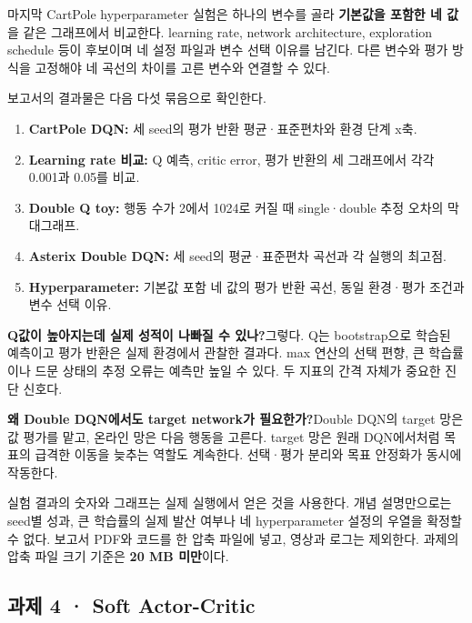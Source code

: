 \documentclass[11pt,a4paper]{article}
\begin{document}
마지막 CartPole hyperparameter 실험은 하나의 변수를 골라 \textbf{기본값을 포함한 네 값}을 같은 그래프에서 비교한다. learning rate, network architecture, exploration schedule 등이 후보이며 네 설정 파일과 변수 선택 이유를 남긴다. 다른 변수와 평가 방식을 고정해야 네 곡선의 차이를 고른 변수와 연결할 수 있다.\par

보고서의 결과물은 다음 다섯 묶음으로 확인한다.\par

\begin{enumerate}
\item \textbf{CartPole DQN:} 세 seed의 평가 반환 평균·표준편차와 환경 단계 x축.
\item \textbf{Learning rate 비교:} Q 예측, critic error, 평가 반환의 세 그래프에서 각각 0.001과 0.05를 비교.
\item \textbf{Double Q toy:} 행동 수가 2에서 1024로 커질 때 single·double 추정 오차의 막대그래프.
\item \textbf{Asterix Double DQN:} 세 seed의 평균·표준편차 곡선과 각 실행의 최고점.
\item \textbf{Hyperparameter:} 기본값 포함 네 값의 평가 반환 곡선, 동일 환경·평가 조건과 변수 선택 이유.
\end{enumerate}

\par\medskip\noindent\textbf{Q값이 높아지는데 실제 성적이 나빠질 수 있나?}\quad 그렇다. Q는 bootstrap으로 학습된 예측이고 평가 반환은 실제 환경에서 관찰한 결과다. max 연산의 선택 편향, 큰 학습률이나 드문 상태의 추정 오류는 예측만 높일 수 있다. 두 지표의 간격 자체가 중요한 진단 신호다.\par

\par\medskip\noindent\textbf{왜 Double DQN에서도 target network가 필요한가?}\quad Double DQN의 target 망은 값 평가를 맡고, 온라인 망은 다음 행동을 고른다. target 망은 원래 DQN에서처럼 목표의 급격한 이동을 늦추는 역할도 계속한다. 선택·평가 분리와 목표 안정화가 동시에 작동한다.\par

실험 결과의 숫자와 그래프는 실제 실행에서 얻은 것을 사용한다. 개념 설명만으로는 seed별 성과, 큰 학습률의 실제 발산 여부나 네 hyperparameter 설정의 우열을 확정할 수 없다. 보고서 PDF와 코드를 한 압축 파일에 넣고, 영상과 로그는 제외한다. 과제의 압축 파일 크기 기준은 \textbf{20 MB 미만}이다.\par

\clearpage
\subsection{과제 4 · Soft Actor-Critic}
\end{document}
